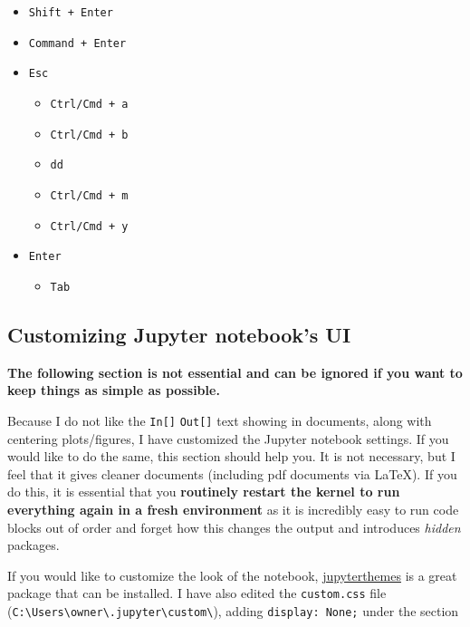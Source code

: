 \documentclass[]{book}
\providecommand{\tightlist}{%
  \setlength{\itemsep}{0pt}\setlength{\parskip}{0pt}}
\begin{document}
\begin{itemize}
\tightlist
\item
  \texttt{Shift\ +\ Enter}
\item
  \texttt{Command\ +\ Enter}
\item
  \texttt{Esc}

  \begin{itemize}
  \tightlist
  \item
    \texttt{Ctrl/Cmd\ +\ a}
  \item
    \texttt{Ctrl/Cmd\ +\ b}
  \item
    \texttt{dd}
  \item
    \texttt{Ctrl/Cmd\ +\ m}
  \item
    \texttt{Ctrl/Cmd\ +\ y}
  \end{itemize}
\item
  \texttt{Enter}

  \begin{itemize}
  \tightlist
  \item
    \texttt{Tab}
  \end{itemize}
\end{itemize}

\hypertarget{customizing-jupyter-notebooks-ui}{%
\subsection{Customizing Jupyter notebook's UI}\label{customizing-jupyter-notebooks-ui}}

\textbf{The following section is not essential and can be ignored if you want to keep things as simple as possible.}

Because I do not like the \texttt{In{[}{]}} \texttt{Out{[}{]}} text showing in documents, along with centering plots/figures, I have customized the Jupyter notebook settings. If you would like to do the same, this section should help you. It is not necessary, but I feel that it gives cleaner documents (including pdf documents via LaTeX). If you do this, it is essential that you \textbf{routinely restart the kernel to run everything again in a fresh environment} as it is incredibly easy to run code blocks out of order and forget how this changes the output and introduces \emph{hidden} packages.

If you would like to customize the look of the notebook, \href{https://Github.com/dunovank/jupyter-themes}{jupyterthemes} is a great package that can be installed. I have also edited the \texttt{custom.css} file (\texttt{C:\textbackslash{}Users\textbackslash{}owner\textbackslash{}.jupyter\textbackslash{}custom\textbackslash{}}), adding \texttt{display:\ None;} under the section
\end{document}
